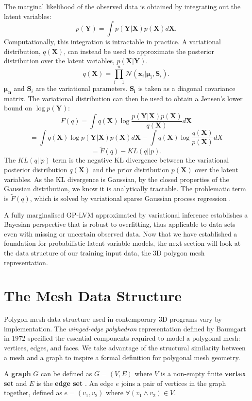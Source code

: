 \documentclass[ %
author={Dillon Keith Diep},
supervisor={Dr. Carl Henrik Ek},
degree={MEng},
title={ART-CG Hair:},
subtitle={Assisted Real-time Content Generation of Stylised Virtual Hair},
type={Research},
year={2017} ]{dissertation}
\begin{document}
The marginal likelihood of the observed data is obtained by integrating out the latent variables:
$$p(\bm{Y})=\int p(\bm{Y|X})p(\bm{X})d\bm{X}.$$
Computationally, this integration is intractable in practice. A variational distribution, $q(\bm{X})$, can instead be used to approximate the posterior distribution over the latent variables, $p(\bm{X|Y})$.
$$q(\bm{X})=\prod^n_{i=1}\mathcal{N}(\bm{x}_i|\bm{\mu}_i,\bm{S}_i).$$
$\bm{\mu_n}$ and $\bm{S}_i$ are the variational parameters. $\bm{S_i}$ is taken as a diagonal covariance matrix. 
The variational distribution can then be used to obtain a Jensen's lower bound on $\log p(\bm{Y})$:
$$F(q)=\int q(\bm{X})\log \frac{ p(\bm{Y|X})p(\bm{X}) }{ q(\bm{X}) } d\bm{X}$$
$$=\int q(\bm{X})\log p(\bm{Y|X})p(\bm{X})d\bm{X} - \int q(\bm{X})\log\frac{q(\bm{X})}{p(\bm{X})}dX$$
$$=\tilde{F}(q)-KL(q||p).$$
The $KL(q||p)$ term is the negative KL divergence between the variational posterior distribution $q(\bm{X})$ and the prior distribution $p(\bm{X})$ over the latent variables. As the KL divergence is Gaussian, by the closed properties of the Gaussian distribution, we know it is analytically tractable. The problematic term is $\tilde{F}(q)$, which is solved by variational sparse Gaussian process regression \cite{bgplvm}.

A fully marginalised GP-LVM approximated by variational inference establishes a Bayesian perspective that is robust to overfitting, thus applicable to data sets even with missing or uncertain observed data. Now that we have established a foundation for probabilistic latent variable models, the next section will look at the data structure of our training input data, the 3D polygon mesh representation.

\section{The Mesh Data Structure}
Polygon mesh data structure used in contemporary 3D programs vary by implementation. The \textit{winged-edge polyhedron} representation defined by Baumgart in 1972 \cite{wingededge} specified the essential components required to model a polygonal mesh: vertices, edges, and faces. We take advantage of the structural similarity between a mesh and a graph to inspire a formal definition for polygonal mesh geometry.

A \textbf{graph} $G$ can be defined as $G=(V,E)$ where $V$ is a non-empty finite \textbf{vertex set} and $E$ is the \textbf{edge set} \cite[p.8]{graphtheory}. An edge $e$ joins a pair of vertices in the graph together, defined as $e=(v_1, v_2)$ where $\forall(v_1 \land v_2)\in V$.
\end{document}
